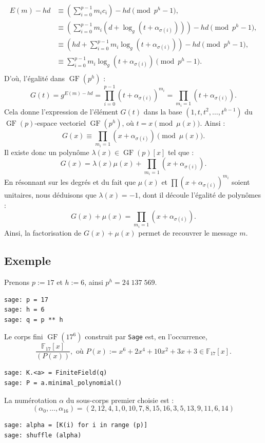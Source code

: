 \documentclass[a4paper, titlepage, 11pt]{article}
\theoremstyle{definition}
\theoremstyle{remark}
\def\F{\mathbb F}
\def\gf{\operatorname{GF}}
\begin{document}
\begin{align*}
E(m) - hd &\equiv \left(\sum_{i=0}^{p-1} m_ic_i\right) - hd \pmod{p^h-1}, \\
&\equiv \left(\sum_{i=0}^{p-1} m_i\left(d + \log_g\left(t + \alpha_{\sigma(i)}\right)\right)\right) - hd \pmod{p^h-1}, \\
&\equiv \left(hd + \sum_{i=0}^{p-1} m_i\log_g\left(t + \alpha_{\sigma(i)}\right)\right) - hd \pmod{p^h-1}, \\
&\equiv  \sum_{i=0}^{p-1} m_i\log_g\left(t + \alpha_{\sigma(i)}\right) \pmod{p^h-1}. \\
\end{align*}
D'où, l'égalité dans $\gf(p^h)$ : 
$$G(t) = g^{E(m) - hd} = \prod_{i=0}^{p-1} \left(t+\alpha_{\sigma(i)}\right)^{m_i} = \prod_{m_i = 1} \left(t+\alpha_{\sigma(i)}\right).$$
Cela donne l'expression de l'élément $G(t)$ dans la base $(1,t,t^2, \dots, t^{h-1})$ du $\gf(p)$-espace vectoriel $\gf(p^h)$, où $t = x \pmod{\mu(x)}$. Ainsi :
$$G(x) \equiv \prod_{m_i = 1} \left(x+\alpha_{\sigma(i)}\right) \pmod{\mu(x)}.$$
Il existe donc un polynôme $\lambda(x) \in \gf(p)[x]$ tel que : $$G(x) = \lambda(x) \mu(x) + \prod_{m_i = 1} \left(x+\alpha_{\sigma(i)}\right).$$
En résonnant sur les degrés et du fait que $\mu(x)$ et $\prod \left(x+\alpha_{\sigma(i)}\right)^{m_i}$ soient unitaires, nous déduisons que $\lambda(x) = -1$, dont il découle l'égalité de polynômes :
$$G(x) + \mu(x) = \prod_{m_i = 1} \left(x+\alpha_{\sigma(i)}\right).$$
Ainsi, la factorisation de $G(x)+\mu(x)$ permet de recouvrer le message $m$.

\subsection*{Exemple}
Prenons $p := 17$ et $h := 6$, ainsi $p^h = 24\;137\;569$.
\begin{verbatim}
sage: p = 17
sage: h = 6
sage: q = p ** h
\end{verbatim}
Le corps fini $\gf(17^6)$ construit par \verb|Sage| est, en l’occurrence, 
$$\frac{\F_{17}[x]}{(P(x))}, \text{ où } P(x) := x^6 + 2x^4 + 10 x^2 +3x +3\in  \F_{17}[x].$$
\begin{verbatim}
sage: K.<a> = FiniteField(q)
sage: P = a.minimal_polynomial()
\end{verbatim}
La numérotation $\alpha$ du sous-corps premier choisie est :
$$(\alpha_0, \dots, \alpha_{16}) = (2, 12, 4, 1, 0, 10, 7, 8, 15, 16, 3, 5, 13, 9, 11, 6, 14)$$
\begin{verbatim}
sage: alpha = [K(i) for i in range (p)]
sage: shuffle (alpha)
\end{verbatim}
\end{document}

